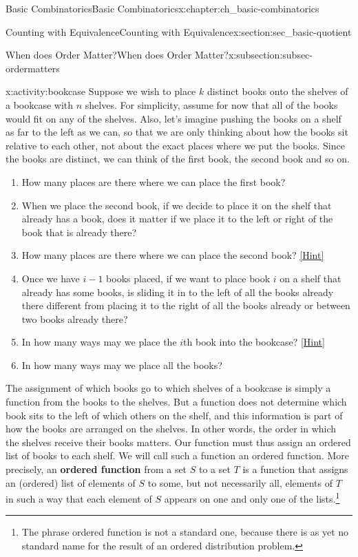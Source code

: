 \documentclass[oneside,10pt,]{book}
\newcommand{\terminology}[1]{\textbf{#1}}
\numberwithin{equation}{chapter}
\begin{document}
\begin{chapterptx}{Basic Combinatorics}{}{Basic Combinatorics}{}{}{x:chapter:ch_basic-combinatorics}
\begin{sectionptx}{Counting with Equivalence}{}{Counting with Equivalence}{}{}{x:section:sec_basic-quotient}
\begin{subsectionptx}{When does Order Matter?}{}{When does Order Matter?}{}{}{x:subsection:subsec-ordermatters}
\begin{activity}{}{x:activity:bookcase}
Suppose we wish to place \(k\) distinct books onto the shelves of a bookcase with \(n\) shelves. For simplicity, assume for now that all of the books would fit on any of the shelves. Also, let's imagine pushing the books on a shelf as far to the left as we can, so that we are only thinking about how the books sit relative to each other, not about the exact places where we put the books. Since the books are distinct, we can think of the first book, the second book and so on.%
\begin{enumerate}[font=\bfseries,label=(\alph*),ref=\alph*]
\item{}How many places are there where we can place the first book?%
\item{}When we place the second book, if we decide to place it on the shelf that already has a book, does it matter if we place it to the left or right of the book that is already there?%
\item{}How many places are there where we can place the second book?%
\space\hspace*{0pt}\hfill{\tiny\hyperlink{g:hint:idm2261-back}{[Hint]}}\item{}Once we have \(i-1\) books placed, if we want to place book \(i\)  on a shelf that already has some books, is sliding it in to the left of all the books already there different from placing it to the right of all the books already or between two books already there?%
\item{}In how many ways may we place the \(i\)th book into the bookcase?%
\space\hspace*{0pt}\hfill{\tiny\hyperlink{g:hint:idm2277-back}{[Hint]}}\item{}In how many ways may we place all the books?%
\end{enumerate}
\end{activity}
The assignment of which books go to which shelves of a bookcase is simply a function from the books to the shelves. But a function does not determine which book sits to the left of which others on the shelf, and this information is part of how the books are arranged on the shelves. In other words, the order in which the shelves receive their books matters.  Our function must thus assign an ordered list of books to each shelf. We will call such a function an ordered function. More precisely, an \terminology{ordered function} from a set \(S\) to a set \(T\) is a function that assigns an (ordered) list of elements of \(S\) to some, but not necessarily all, elements of \(T\) in such a way that each element of \(S\) appears on one and only one of the lists.\footnote{The phrase ordered function is not a standard one, because there is as yet no standard name for the result of an ordered distribution problem.\label{g:fn:idm2305}}%

\end{subsectionptx}
\end{sectionptx}
\end{chapterptx}
\end{document}
